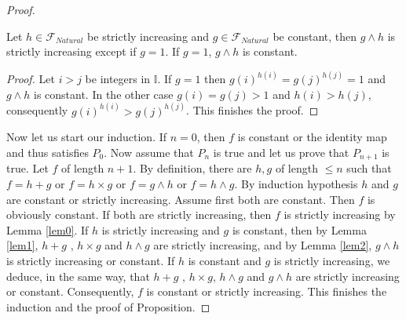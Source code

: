 \documentclass[10pt,a4paper]{amsart}
\newcommand{\I}{\mathbb{I}}
\renewcommand{\leq}{\leqslant}
\begin{document}
\begin{proof}
\begin{lemm} \label{lem2} Let $h \in \mathscr{F}_{Natural}$ be strictly increasing and $g  \in \mathscr{F} _{Natural}$ be constant, then $g \wedge h $ is strictly increasing except if $g=1$. If $g=1$, $g \wedge h $ is constant.
\end{lemm}

\begin{proof} Let $i>j$ be integers in $\I$. If $g=1$ then $g(i) ^{ h(i)}=g(j) ^{ h(j)}=1$ and $g \wedge h$ is constant. In the other case $g(i)=g(j) >1$ and $h(i)>h(j)$, consequently $g(i) ^ {h(i)} > g (j) ^{ h(j)}$. This finishes the proof.
\end{proof}
 
 Now let us start our induction. If $n=0$, then $f$ is constant or the identity map and thus satisfies $P_0$. Now assume that $P_n$ is true and let us prove that $P_{n+1}$ is true. Let $f $ of length $n+1$.  By definition, there are $h,g $ of length $\leq n$ such that $f=h+g$ or $f=h \times g $ or $f = g \wedge h$ or $f= h \wedge g$. By induction hypothesis $h$ and $g$ are constant or strictly increasing.  Assume first both are constant. Then $f$ is obviously constant. If both are strictly increasing, then $f$ is strictly increasing by Lemma \ref{lem0}. If $h$ is strictly increasing and $g$ is constant, then by Lemma \ref{lem1}, $h+g$ , $h \times g$ and $h \wedge g$ are strictly increasing, and by Lemma \ref{lem2}, $g \wedge h$ is strictly increasing or constant. If $h$ is constant and $g$ is strictly increasing, we deduce, in the same way, that $h+g$ , $h \times g$, $h \wedge g$ and $g \wedge h$ are strictly increasing or constant. Consequently, $f$ is constant or strictly increasing. This finishes the induction and the proof of Proposition.


\end{proof}
\end{document}
